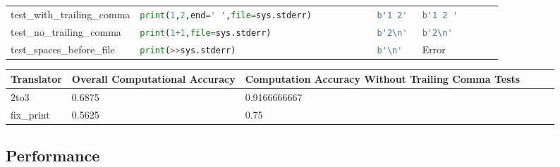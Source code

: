 \begin{table}[ht]
\begin{tabular}{@{}l|lll@{}}
    test\_with\_trailing\_comma           & \lstinline[language=Python, style=pythonstyle]|print(1,2,end=' ',file=sys.stderr)           | & \lstinline[language=Python, style=pythonstyle]|b'1 2'|                                 & \lstinline[language=Python, style=pythonstyle]|b'1 2 '       |                \\
    test\_no\_trailing\_comma             & \lstinline[language=Python, style=pythonstyle]|print(1+1,file=sys.stderr)                   | & \lstinline[language=Python, style=pythonstyle]|b'2\n' |                 & \lstinline[language=Python, style=pythonstyle]|b'2\n'        | \\
    test\_spaces\_before\_file            & \lstinline[language=Python, style=pythonstyle]|print(>>sys.stderr)| & \lstinline[language=Python, style=pythonstyle]|b'\n'|                   & Error                         \\ \bottomrule
    \end{tabular}
\end{table}

\begin{table}[ht]
    \begin{tabular}{@{}l|lllll@{}}
    \toprule
    Translator & Overall Computational Accuracy & Computation Accuracy Without Trailing Comma Tests \\ \midrule
    2to3       & \multicolumn{1}{l}{0.6875}     & \multicolumn{1}{l}{0.9166666667}                  \\
    fix\_print & \multicolumn{1}{l}{0.5625}     & \multicolumn{1}{l}{0.75}                          \\ \bottomrule
    \end{tabular}
\end{table}

\subsection{Performance}

